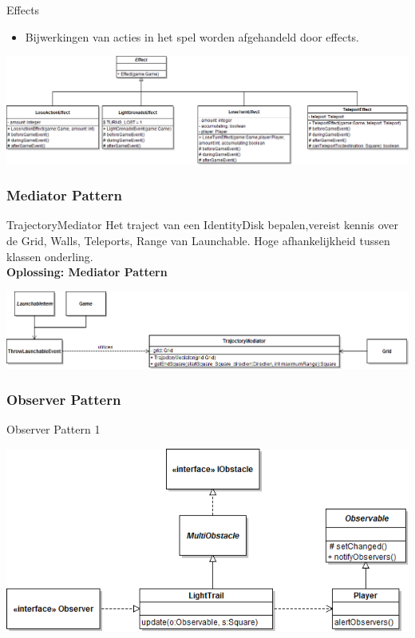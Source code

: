 \documentclass[t]{beamer}
\begin{document}
\begin{frame}{Effects}
\begin{center}
\begin{itemize}
\item Bijwerkingen van acties in het spel worden afgehandeld door effects.
\end{itemize}
\vspace{0.3in}
\includegraphics[width=1\linewidth]{images/Effects}
\end{center}
\end{frame}

\subsubsection{Mediator Pattern}
\begin{frame}{TrajectoryMediator}
Het traject van een IdentityDisk bepalen,vereist kennis over de Grid, Walls, Teleports, Range van Launchable. Hoge afhankelijkheid tussen klassen onderling.\\
\textbf{Oplossing: Mediator Pattern}
\vspace{0.3in}
\begin{center}
\includegraphics[width=1\linewidth]{images/TrajectoryMediator}
\end{center}
\end{frame}

\subsubsection{Observer Pattern}
\begin{frame}{Observer Pattern 1}
\begin{center}
\includegraphics[width=1\linewidth]{images/observer1}
\end{center}
\end{frame}
\end{document}
